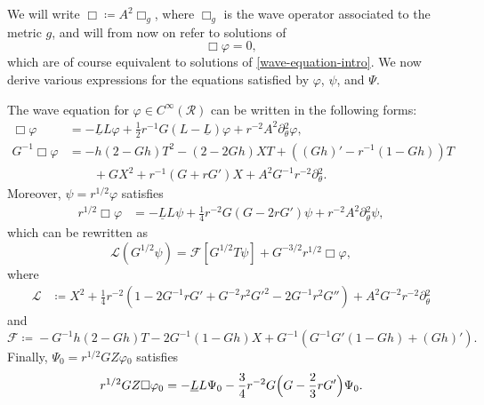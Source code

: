 \documentclass[10pt, reqno]{amsart}
\begin{document}
We will write \(\Box{}\coloneqq{}A^2\Box_g\), where \(\Box_g\) is the wave operator associated to
the metric \(g\), and will from now on refer to solutions of
\begin{equation}\label{wave-equation}
\Box{}\varphi{} = 0,
\end{equation}
which are of course equivalent to solutions of \cref{wave-equation-intro}. We now
derive various expressions for the equations satisfied by \(\varphi{}\), \(\psi{}\),
and \(\Psi{}\).
\begin{lemma}
The wave equation for \(\varphi{}\in C^\infty(\mathcal{R})\) can be written in the
following forms:
\begin{align}
\Box{}\varphi{} &= -\underline{L}L\varphi{} + \frac{1}{2}r^{-1}G(L-\underline{L})\varphi{} + r^{-2}A^2\partial{}_\theta^2\varphi{}, \label{box-equation-double-null} \\
G^{-1}\Box{}\varphi{} &= -h(2-Gh)T^2 - (2-2Gh)XT + ((Gh)' - r^{-1}(1-Gh))T \nonumber \\
&\qquad + GX^2 + r^{-1}(G + rG')X + A^2G^{-1}r^{-2}\partial{}_\theta^2. \label{box-equation-TX}
\end{align}
Moreover, \(\psi{} = r^{1/2}\varphi{}\) satisfies
\begin{align}
r^{1/2}\Box{}\varphi{} &= -\underline{L}L\psi{} + \frac{1}{4}r^{-2}G(G - 2rG')\psi{} + r^{-2}A^2\partial{}_\theta^2\psi{}, \label{equation-for-psi}
\end{align}
which can be rewritten as
\begin{equation}\label{equation-for-psi-TX}
\mathcal{L}(G^{1/2}\psi{}) = \mathcal{F}[G^{1/2}T\psi{}] + G^{-3/2}r^{1/2}\Box{}\varphi{},
\end{equation}
where
\begin{equation}\label{calL-def}
\begin{split}
\mathcal{L}&\coloneqq{}X^2 + \frac{1}{4}r^{-2}(1-2G^{-1}rG' + G^{-2}r^2G'^2 - 2G^{-1}r^2G'') + A^2G^{-2}r^{-2}\partial{}_\theta^2
\end{split}
\end{equation}
and
\begin{equation}\label{calF-def}
\mathcal{F}\coloneqq{}-G^{-1}h(2-Gh)T - 2G^{-1}(1-Gh)X + G^{-1}(G^{-1}G'(1-Gh) + (Gh)').
\end{equation}
Finally, \(\Psi{}_0 = r^{1/2}GZ\varphi{}_0\) satisfies
\begin{equation}\label{equation-for-Psi}
r^{1/2}GZ\Box{}\varphi{}_0 = -\underline{L}L\Psi{}_0 - \frac{3}{4}r^{-2}G\Bigl(G - \frac{2}{3}rG'\Bigr)\Psi{}_0.
\end{equation}
\label{wave-equation-expressions}
\end{lemma}
\end{document}
